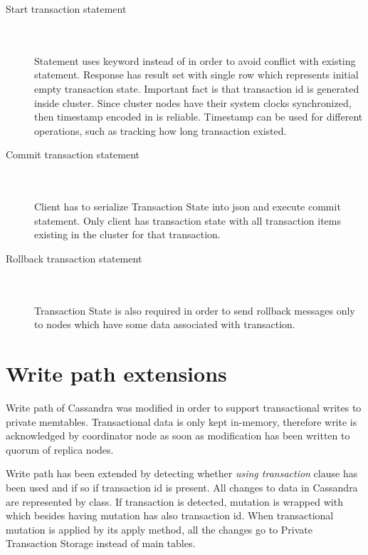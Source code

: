 \begin{description}
\item[Start transaction statement] \hfill \\  \\
Statement uses  keyword instead of  in order to avoid conflict with existing  statement. Response has result set with single row which represents initial empty transaction state. 
 Important fact is that transaction id is generated inside cluster. Since cluster nodes have their system clocks synchronized, then timestamp encoded in  is reliable. Timestamp can be used for different operations, such as tracking how long transaction existed.
\item[Commit transaction statement] \hfill \\  \\ Client has to serialize Transaction State into json and execute commit statement. Only client has transaction state with all transaction items existing in the cluster for that transaction.
\item[Rollback transaction statement] \hfill \\  \\
Transaction State is also required in order to send rollback messages only to nodes which have some data associated with transaction.
\end{description}



\section{Write path extensions}
Write path of Cassandra \cite{CassandraWritePath} was modified in order to support transactional writes to private memtables. 
Transactional data is only kept in-memory, therefore write is acknowledged by coordinator node as soon as modification has been written to quorum of replica nodes.


Write path has been extended by detecting whether \emph{using transaction} clause has been used and if so if transaction id is present. All changes to data in Cassandra are represented by  class. If transaction is detected, mutation is wrapped with  which besides having mutation has also transaction id.
When transactional mutation is applied by its apply method, all the changes go to Private Transaction Storage instead of main tables.


